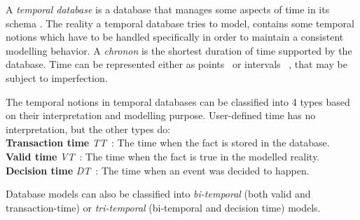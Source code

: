 %
%
A \emph{temporal database} is a database that manages some aspects of time in its schema \cite{Dyreson1994}. The reality a temporal database tries to model, contains some temporal notions which have to be handled specifically in order to maintain a consistent modelling behavior. A \emph{chronon} is the shortest duration of time supported by the database. Time can be represented either as points~\cite{Dubois89} or intervals ~\cite{garrido2009},\cite{655777} that may be subject to imperfection.





\begin{svgraybox}
The temporal notions in temporal databases can be classified into 4 types based on their interpretation and modelling purpose. User-defined time has no interpretation, but the other types do:\\

	\textbf{Transaction time} \emph{TT}~\cite{Jensen:1991:IIM:627283.627484}: The time when the fact is stored in the database.\\
	
	\textbf{Valid time} \emph{VT}~\cite{Snodgrass:1984:TQL:588011.588041}: The time when the fact is true in the modelled reality.\\
	
	\textbf{Decision time} \emph{DT}~\cite{Nascimento95}: The time when an event was decided to happen. \\
\end{svgraybox}
	
Database models can also be classified into \emph{bi-temporal} (both valid and transaction-time) or \emph{tri-temporal}  (bi-temporal and decision time) models.


